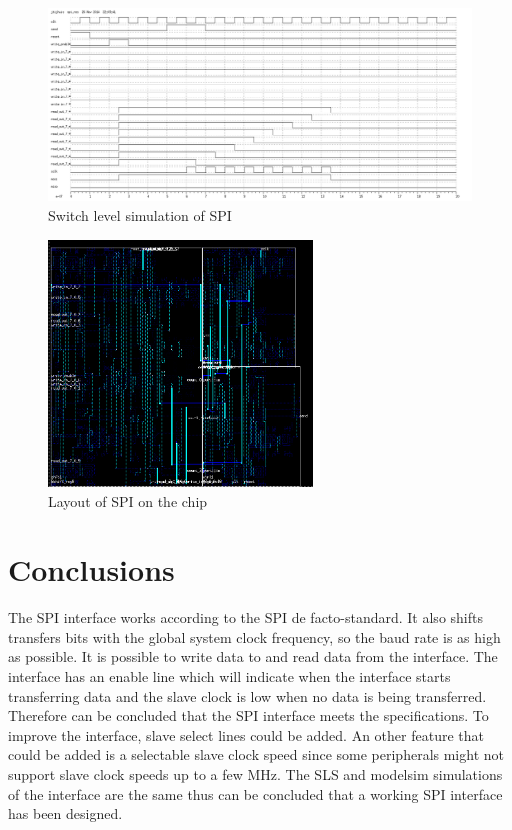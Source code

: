 \documentclass[11pt,twoside,a4paper]{article}
\begin{document}
\begin{figure}[H]
\center
\includegraphics[width=16cm]{./switch_level}
\caption{Switch level simulation of SPI}
\label{switch-level}
\end{figure}

\begin{figure}[H]
\center
\includegraphics[width=7cm]{./spi_layout}
\caption{Layout of SPI on the chip}
\label{spi-layout}
\end{figure}

\section{Conclusions}
The SPI interface works according to the SPI  de facto-standard. It also shifts transfers bits with the global system clock frequency, so the baud rate is as high as possible. It is possible to write data to and read data from the interface. The interface has an enable line which will indicate when the interface starts transferring data and the slave clock is low when no data is being transferred. Therefore can be concluded that the SPI interface meets the specifications. To improve the interface, slave select lines could be added. An other feature that could be added is a selectable slave clock speed since some peripherals might not support slave clock speeds up to a few MHz. The SLS and modelsim simulations of the interface are the same thus can be concluded that a working SPI interface has been designed.
\end{document}
